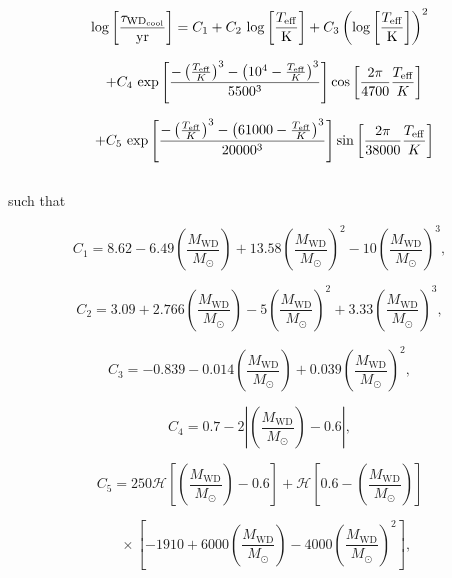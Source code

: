 \documentclass[fleqn,usenatbib]{mnras}
\begin{document}
\[
{\rm log}\left[\frac{
\tau_{{\text{WD}}_{\text{cool}}}
}{\rm yr}\right] 
= 
C_1 + C_2 \ {\rm log}\left[ \frac{T_{\rm eff}}{\rm K} \right]
+
C_3  \left( {\rm log}\left[ \frac{T_{\rm eff}}{\rm K} \right]\right)^2
\]


\[
\ \ +C_4 \ {\rm exp} \left[  
\frac{-\left(\frac{T_{\rm eff}}{K}\right)^3 - \left(10^4 - \frac{T_{\rm eff}}{K} \right)^3}
{5500^3}
\right]
\cos{\left[ \frac{2\pi}{4700} \frac{T_{\rm eff}}{K} \right]}
\]

\[
\ \ +C_5 \ {\rm exp} \left[  
\frac{-\left(\frac{T_{\rm eff}}{K}\right)^3 - \left(61000 - \frac{T_{\rm eff}}{K} \right)^3}
{20000^3}
\right]
\sin{\left[ \frac{2\pi}{38000} \frac{T_{\rm eff}}{K} \right]}
\]

\begin{equation}
\end{equation}

\noindent{}such that


\begin{equation}
C_1 = 8.62 
     - 6.49 \left( \frac{M_\text{WD}}{M_{\odot}} \right)
     +13.58 \left( \frac{M_\text{WD}}{M_{\odot}} \right)^2
     - 10 \left( \frac{M_\text{WD}}{M_{\odot}} \right)^3
     ,
\end{equation}

\begin{equation}
C_2 = 3.09 
     + 2.766 \left( \frac{M_\text{WD}}{M_{\odot}} \right)
      - 5 \left( \frac{M_\text{WD}}{M_{\odot}} \right)^2
     + 3.33 \left( \frac{M_\text{WD}}{M_{\odot}} \right)^3
     ,
\end{equation}

\begin{equation}
C_3 = -0.839 
     - 0.014 \left( \frac{M_\text{WD}}{M_{\odot}} \right)
     +0.039 \left( \frac{M_\text{WD}}{M_{\odot}} \right)^2
     ,
\end{equation}

\begin{equation}
C_4 = 0.7 - 2\left|\left( \frac{M_\text{WD}}{M_{\odot}} \right) - 0.6 \right|
,
\end{equation}

\[
C_5= 250 \mathcal{H}\left[ \left( \frac{M_\text{WD}}{M_{\odot}} \right) - 0.6 \right]
+
\mathcal{H}\left[ 0.6 - \left( \frac{M_\text{WD}}{M_{\odot}} \right) \right]
\]

\begin{equation}
\ \ \ \ \times
            \left[-1910 + 6000 \left( \frac{M_\text{WD}}{M_{\odot}} \right) - 4000 \left( \frac{M_\text{WD}}{M_{\odot}} \right)^2   \right]
            ,
\end{equation}
\end{document}
